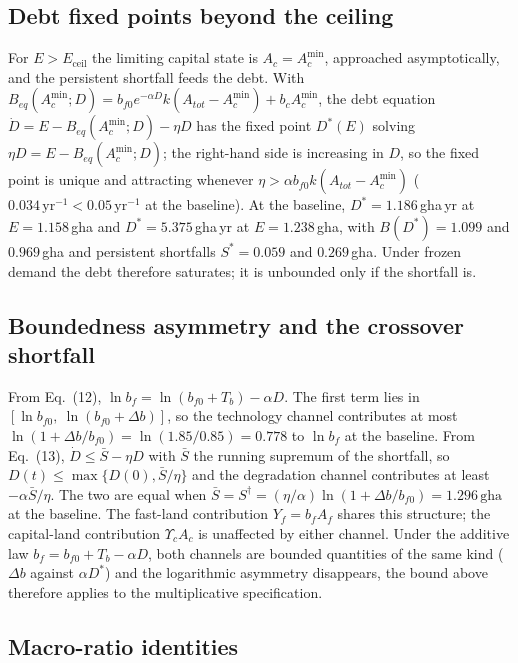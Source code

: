 \documentclass[11pt,a4paper]{article}
\newcommand{\Ups}{\Upsilon_c}
\newcommand{\Eceil}{E_{\mathrm{ceil}}}
\newcommand{\Acmin}{A_c^{\min}}
\begin{document}
\subsection{Debt fixed points beyond the ceiling}\label{si:debt}

For $E>\Eceil$ the limiting capital state is $A_c=\Acmin$, approached asymptotically, and the persistent shortfall feeds the debt. With $B_{eq}(\Acmin;D)=b_{f0}e^{-\alpha D}k(A_{tot}-\Acmin)+b_c\Acmin$, the debt equation $\dot D=E-B_{eq}(\Acmin;D)-\eta D$ has the fixed point $D^*(E)$ solving $\eta D=E-B_{eq}(\Acmin;D)$; the right-hand side is increasing in $D$, so the fixed point is unique and attracting whenever $\eta>\alpha b_{f0}k(A_{tot}-\Acmin)$ ($0.034\,\mathrm{yr}^{-1}<0.05\,\mathrm{yr}^{-1}$ at the baseline). At the baseline, $D^*=1.186$\,gha\,yr at $E=1.158$\,gha and $D^*=5.375$\,gha\,yr at $E=1.238$\,gha, with $B(D^*)=1.099$ and $0.969$\,gha and persistent shortfalls $S^*=0.059$ and $0.269$\,gha. Under frozen demand the debt therefore saturates; it is unbounded only if the shortfall is.

\subsection{Boundedness asymmetry and the crossover shortfall}\label{si:bounded}

From Eq.~(12), $\ln b_f=\ln(b_{f0}+T_b)-\alpha D$. The first term lies in $[\ln b_{f0},\ \ln(b_{f0}+\Delta b)]$, so the technology channel contributes at most $\ln(1+\Delta b/b_{f0})=\ln(1.85/0.85)=0.778$ to $\ln b_f$ at the baseline. From Eq.~(13), $\dot D\le\bar S-\eta D$ with $\bar S$ the running supremum of the shortfall, so $D(t)\le\max\{D(0),\bar S/\eta\}$ and the degradation channel contributes at least $-\alpha\bar S/\eta$. The two are equal when $\bar S=S^\dagger=(\eta/\alpha)\ln(1+\Delta b/b_{f0})=1.296\,\mathrm{gha}$ at the baseline. The fast-land contribution $Y_f=b_fA_f$ shares this structure; the capital-land contribution $\Ups A_c$ is unaffected by either channel. Under the additive law $b_f=b_{f0}+T_b-\alpha D$, both channels are bounded quantities of the same kind ($\Delta b$ against $\alpha D^*$) and the logarithmic asymmetry disappears, the bound above therefore applies to the multiplicative specification.

\subsection{Macro-ratio identities}\label{si:ratios}
\end{document}
